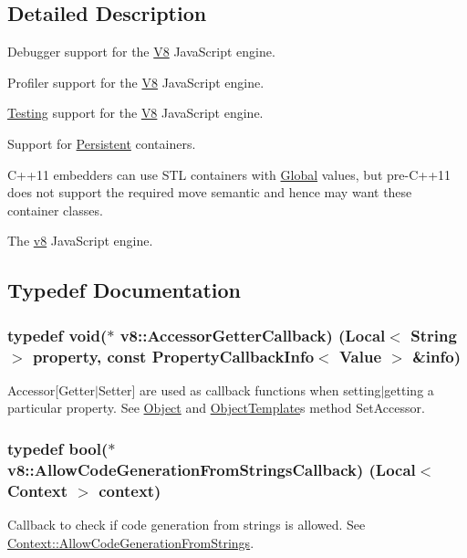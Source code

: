 \subsection{Detailed Description}
Debugger support for the \hyperlink{classv8_1_1V8}{V8} Java\+Script engine.

Profiler support for the \hyperlink{classv8_1_1V8}{V8} Java\+Script engine.

\hyperlink{classv8_1_1Testing}{Testing} support for the \hyperlink{classv8_1_1V8}{V8} Java\+Script engine.

Support for \hyperlink{classv8_1_1Persistent}{Persistent} containers.

C++11 embedders can use S\+T\+L containers with \hyperlink{classv8_1_1Global}{Global} values, but pre-\/\+C++11 does not support the required move semantic and hence may want these container classes.

The \hyperlink{namespacev8}{v8} Java\+Script engine. 

\subsection{Typedef Documentation}
\hypertarget{namespacev8_a722613c87061708a4f1aa050d095f868}{}
\subsubsection[{Accessor\+Getter\+Callback}]{\setlength{\rightskip}{0pt plus 5cm}typedef void($\ast$ v8\+::\+Accessor\+Getter\+Callback) ({\bf Local}$<$ {\bf String} $>$ property, const {\bf Property\+Callback\+Info}$<$ {\bf Value} $>$ \&info)}\label{namespacev8_a722613c87061708a4f1aa050d095f868}
Accessor\mbox{[}Getter$\vert$\+Setter\mbox{]} are used as callback functions when setting$\vert$getting a particular property. See \hyperlink{classv8_1_1Object}{Object} and \hyperlink{classv8_1_1ObjectTemplate}{Object\+Template}\textquotesingle{}s method Set\+Accessor. \hypertarget{namespacev8_a521d909ec201742a1cb35d50a8e2a3c2}{}
\subsubsection[{Allow\+Code\+Generation\+From\+Strings\+Callback}]{\setlength{\rightskip}{0pt plus 5cm}typedef bool($\ast$ v8\+::\+Allow\+Code\+Generation\+From\+Strings\+Callback) ({\bf Local}$<$ {\bf Context} $>$ context)}\label{namespacev8_a521d909ec201742a1cb35d50a8e2a3c2}
Callback to check if code generation from strings is allowed. See \hyperlink{classv8_1_1Context_a794ccc42113566f5d363f89c8b0d3c2c}{Context\+::\+Allow\+Code\+Generation\+From\+Strings}. \hypertarget{namespacev8_ab699f4bbbb56350e6e915682e420fcdc}{}
